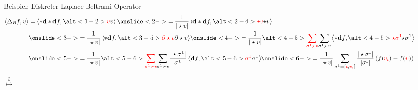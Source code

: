 \documentclass[handout]{beamer}
\newcommand{\exd}{\mathbf{d}}
\newcommand{\tred}[1]{\textcolor{red}{#1}}
\begin{document}
  \begin{frame}
    \begin{block}{Beispiel: Diskreter Laplace-Beltrami-Operator}
    \small
      \begin{align*}
        \left\langle \Delta_{B}f, v \right\rangle 
            &= \left\langle *\exd*\exd f, \alt<1-2>{\tred{v}}{v} \right\rangle
            \onslide<2->{= \frac{1}{|\star v|}\left\langle \exd*\exd f, \alt<2-4>{\tred{\star v}}{\star v} \right\rangle}&\\
            &\onslide<3->{= \frac{1}{|\star v|}\left\langle *\exd f, \alt<3-5>{\tred{\partial\star v}}{\partial\star v} \right\rangle}
            \onslide<4->{=\frac{1}{|\star v|}\alt<4-5>{\tred{\sum_{\sigma^{1}\succ v}}}{\sum_{\sigma^{1}\succ v}}\left\langle *\exd f, \alt<4-5>{\tred{\star\sigma^{1}}}{\star\sigma^{1}}
                                  \right\rangle}&\\
            &\onslide<5->{=\frac{1}{|\star v|}\alt<5-6>{\tred{\sum_{\sigma^{1}\succ v}}}{\sum_{\sigma^{1}\succ v}} \frac{|\star\sigma^{1}|}{|\sigma^{1}|}
                          \left\langle \exd f, \alt<5-6>{\tred{\sigma^{1}}}{\sigma^{1}}\right\rangle}
            \onslide<6->{=\frac{1}{|\star v|}\sum_{\sigma^{1}=\left[ \tred{v},\tred{v_{i}} \right]} \frac{|\star\sigma^{1}|}{|\sigma^{1}|}
                          \left( f(\tred{v_{i}}) - f(\tred{v}) \right)}
      \end{align*}
    \end{block}
    \begin{overprint}
          \begin{minipage}{0.4\textwidth}
            \centering 
          \end{minipage}\hfill
          \begin{minipage}{0.4\textwidth}
            \centering 
          \end{minipage}\hfill
          {\Huge\(\overset{\partial}{\longmapsto}\)}  \hfill
          \begin{minipage}{0.4\textwidth}
            \centering 
          \end{minipage}
          \begin{minipage}{0.4\textwidth}

\end{minipage}
\end{overprint}
\end{frame}
\end{document}
